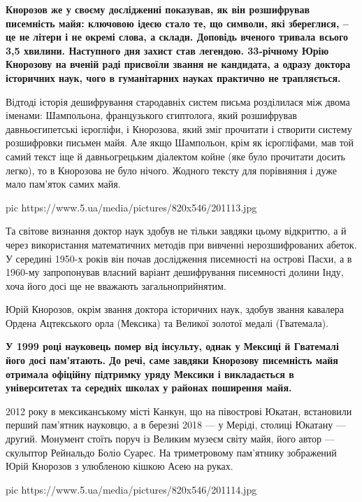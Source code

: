 \begin{leftbar}
\bfseries
Кнорозов же у своєму дослідженні показував, як він розшифрував
писемність майя: ключовою ідеєю стало те, що символи, які збереглися, –
це не літери і не окремі слова, а склади. Доповідь вченого тривала
всього 3,5 хвилини. Наступного дня захист став легендою. 33-річному Юрію
Кнорозову на вченій раді присвоїли звання не кандидата, а одразу доктора
історичних наук, чого в гуманітарних науках практично не трапляється.
\end{leftbar}

Відтоді історія дешифрування стародавніх систем письма розділилася між
двома іменами: Шампольона, французького єгиптолога, який розшифрував
давньоєгипетські ієрогліфи, і Кнорозова, який зміг прочитати і створити
систему розшифровки письмен майя. Але якщо Шампольон, крім як ієрогліфами,
мав той самий текст іще й давньогрецьким діалектом койне (яке було
прочитати досить легко), то в Кнорозова не було нічого. Жодного тексту для
порівняння і дуже мало пам'яток самих майя.

\ifcmt
pic https://www.5.ua/media/pictures/820x546/201113.jpg
\fi

Та світове визнання доктор наук здобув не тільки завдяки цьому відкриттю,
а й через використання математичних методів при вивченні нерозшифрованих
абеток. У середині 1950-х років він почав дослідження писемності на
острові Пасхи, а в 1960-му запропонував власний варіант дешифрування
писемності долини Інду, хоча його досі ще не вважають загальноприйнятим.

Юрій Кнорозов, окрім звання доктора історичних наук, здобув звання
кавалера Ордена Ацтекського орла (Мексика) та Великої золотої медалі
(Гватемала).

\begin{leftbar}
\bfseries
У 1999 році науковець помер від інсульту, однак у Мексиці й Гватемалі
його досі пам'ятають. До речі, саме завдяки Кнорозову писемність майя
отримала офіційну підтримку уряду Мексики і викладається в університетах
та середніх школах у районах поширення майя.
\end{leftbar}

2012 року в мексиканському місті Канкун, що на півострові Юкатан,
встановили перший пам'ятник науковцю, а в березні 2018 --- у Меріді, столиці
Юкатану --- другий. Монумент стоїть поруч із Великим музеєм світу майя, його
автор --- скульптор Рейнальдо Боліо Суарес. На триметровому пам'ятнику
зображений Юрій Кнорозов з улюбленою кішкою Асею на руках.

\ifcmt
pic https://www.5.ua/media/pictures/820x546/201114.jpg
\fi

